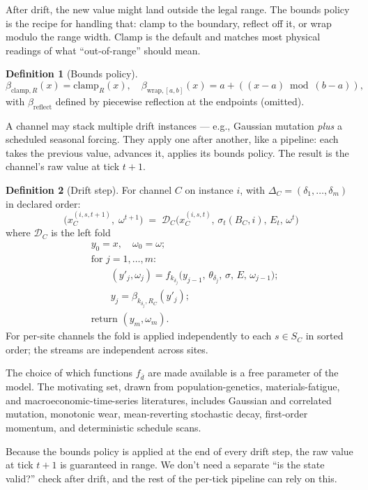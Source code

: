 \documentclass[journal,onecolumn,11pt]{IEEEtran}
\theoremstyle{definition}
\newtheorem{definition}{Definition}
\begin{document}
After drift, the new value might land outside the legal range. The bounds policy is the recipe for handling that: clamp to the boundary, reflect off it, or wrap modulo the range width. Clamp is the default and matches most physical readings of what ``out-of-range'' should mean.

\begin{definition}[Bounds policy]
\[
\beta_{\mathrm{clamp},R}(x) = \mathrm{clamp}_R(x),\quad
\beta_{\mathrm{wrap},[a,b]}(x) = a + ((x-a) \bmod (b-a)),
\]
with $\beta_{\mathrm{reflect}}$ defined by piecewise reflection at the endpoints (omitted).
\end{definition}

A channel may stack multiple drift instances --- e.g., Gaussian mutation \emph{plus} a scheduled seasonal forcing. They apply one after another, like a pipeline: each takes the previous value, advances it, applies its bounds policy. The result is the channel's raw value at tick $t+1$.

\begin{definition}[Drift step]\label{def:drift}
For channel $C$ on instance $i$, with $\Delta_C = (\delta_1, \ldots, \delta_m)$ in declared order:
\[
\bigl(x_C^{(i,s,t+1)},\; \omega^{t+1}\bigr) \;=\; \mathcal{D}_C\!\bigl(x_C^{(i,s,t)},\, \sigma_t(B_C,i),\, E_t,\, \omega^t\bigr)
\]
where $\mathcal{D}_C$ is the left fold
\begin{align*}
&y_0 = x,\quad \omega_0 = \omega; \\
&\text{for } j = 1, \ldots, m: \\
&\qquad (y'_j, \omega_j) = f_{k_{\delta_j}}\!\bigl(y_{j-1},\, \theta_{\delta_j},\, \sigma,\, E,\, \omega_{j-1}\bigr); \\
&\qquad y_j = \beta_{k_{\delta_j}, R_C}(y'_j); \\
&\text{return } (y_m, \omega_m).
\end{align*}
For per-site channels the fold is applied independently to each $s \in S_C$ in sorted order; the streams are independent across sites.
\end{definition}

The choice of which functions $f_{\bar{d}}$ are made available is a free parameter of the model. The motivating set, drawn from population-genetics, materials-fatigue, and macroeconomic-time-series literatures, includes Gaussian and correlated mutation, monotonic wear, mean-reverting stochastic decay, first-order momentum, and deterministic schedule scans.

Because the bounds policy is applied at the end of every drift step, the raw value at tick $t+1$ is guaranteed in range. We don't need a separate ``is the state valid?'' check after drift, and the rest of the per-tick pipeline can rely on this.
\end{document}
